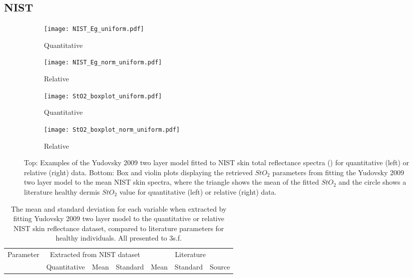 \begin{subappendices}
\subsection{NIST}
\begin{figure}[h]
    \centering
    \begin{subfigure}{0.49\textwidth}
        \texttt{[image: NIST\_Eg\_uniform.pdf]}
        \caption{Quantitative}
        \label{fig:egspectraNISTu}
    \end{subfigure}
    \begin{subfigure}{0.49\textwidth}
        \texttt{[image: NIST\_Eg\_norm\_uniform.pdf]}
        \caption{Relative}
        \label{fig:egspectraNISTnormu}
    \end{subfigure}
    \begin{subfigure}{0.49\textwidth}
        \texttt{[image: StO2\_boxplot\_uniform.pdf]}
        \caption{Quantitative}
        \label{fig:egparamStO2NISTu}
    \end{subfigure}
    \begin{subfigure}{0.49\textwidth}
        \texttt{[image: StO2\_boxplot\_norm\_uniform.pdf]}
        \caption{Relative}
        \label{fig:egparamStO2NISTnormu}
    \end{subfigure}
    \caption{Top: Examples of the Yudovsky 2009 two layer model fitted to NIST skin total reflectance spectra () for quantitative (left) or relative (right) data. Bottom: Box and violin plots displaying the retrieved $StO_2$ parameters from fitting the Yudovsky 2009 two layer model to the mean NIST skin spectra, where the triangle shows the mean of the fitted $StO_2$ and the circle shows a literature healthy dermis $StO_2$ value \citep{VanManen2021} for quantitative (left) or relative (right) data.}
    \label{fig:NISTuniform}
\end{figure}
\begin{table}[h]
    \centering
    \caption{The mean and standard deviation for each variable when extracted by fitting Yudovsky 2009 two layer model to the quantitative or relative NIST skin reflectance dataset, compared to literature parameters for healthy individuals. All presented to 3s.f.}
    \begin{tabular}{|c|ccc|ccc|}
        \hline
        \multirow{2}{*}{Parameter} & \multicolumn{3}{c}{Extracted from NIST dataset} & \multicolumn{3}{|c|}{Literature} \\
        \cline{2-7}
         & Quantitative & \multirow{2}{*}{Mean} & Standard & \multirow{2}{*}{Mean} & Standard & \multirow{2}{*}{Source} \\

\end{tabular}
\end{table}
\end{subappendices}

